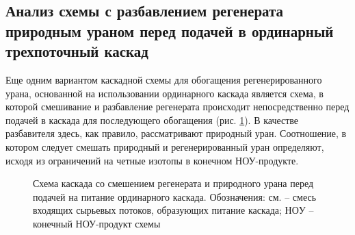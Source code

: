 \subsection{Анализ схемы с разбавлением регенерата природным ураном перед подачей в ординарный трехпоточный каскад}

Еще одним вариантом каскадной схемы для обогащения регенерированного урана, основанной на использовании ординарного каскада является схема, в которой смешивание и разбавление регенерата происходит непосредственно перед подачей в каскада для последующего обогащения (рис. \ref{o3}). В качестве разбавителя здесь, как правило, рассматривают природный уран. Соотношение, в котором следует смешать природный и регенерированный уран определяют, исходя из ограничений на четные изотопы в конечном НОУ-продукте.

\begin{figure}[ht]
  \caption{Схема каскада со смешением регенерата и природного урана перед подачей на питание ординарного каскада. Обозначения: см. -- смесь входящих сырьевых потоков, образующих питание каскада; $НОУ$ -- конечный НОУ-продукт схемы}\label{o3}
\end{figure}

